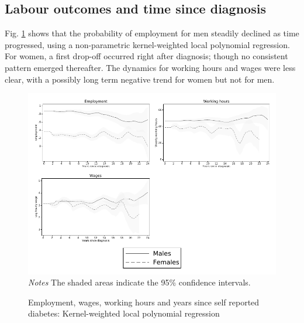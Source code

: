 \documentclass[12pt,english]{article}
\begin{document}
\subsection{\label{sec:duration}Labour outcomes and time since diagnosis }

Fig. \ref{fig:Kernel-weighted-local-polynomial_comb} shows that the probability of employment for men steadily declined as time progressed, using a non-parametric kernel-weighted local polynomial regression. For women, a first drop-off occurred right after diagnosis; though no consistent pattern emerged thereafter. The dynamics for working hours and wages were less clear, with a possibly long term negative trend for women but not for men.

\begin{figure}[!ht]
	\caption{\label{fig:Kernel-weighted-local-polynomial_comb}Employment, wages, working hours and years since self reported diabetes:  Kernel-weighted local polynomial regression}%
	\begin{center}
		\includegraphics[width=\linewidth]{figures/lpoly_combined.pdf}\\
		\footnotesize{\textit{Notes} The shaded areas indicate the 95\% confidence intervals.}
	\end{center}
\end{figure}
\end{document}
